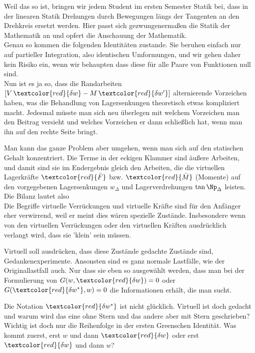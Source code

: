 Weil das so ist, bringen wir jedem Student im ersten Semester Statik bei, dass in der linearen Statik Drehungen durch Bewegungen l\"{a}ngs der Tangenten an den Drehkreis ersetzt werden. Hier passt sich gezwungenerma{\ss}en die Statik der Mathematik an und opfert die Anschauung der Mathematik.
\\

Genau so kommen die folgenden Identit\"{a}ten zustande. Sie beruhen einfach nur auf partieller Integration, also identischen Umformungen, und wir gehen daher kein Risiko ein, wenn wir behaupten dass diese f\"{u}r alle Paare von Funktionen null sind.
\\

Nun ist es ja so, dass die Randarbeiten $[V\,\textcolor{red}{\delta w} - M\,\textcolor{red}{\delta w'}]$ alternierende Vorzeichen haben, was die Behandlung von Lagersenkungen theoretisch etwas kompliziert macht. Jedesmal m\"{u}sste man sich neu \"{u}berlegen mit welchem Vorzeichen man den Beitrag versieht und welches Vorzeichen er dann schlie{\ss}lich hat, wenn man ihn auf den rechte Seite bringt.

Man kann das ganze Problem aber umgehen, wenn man sich auf den statischen Gehalt konzentriert. Die Terme in der eckigen Klammer sind \"{a}u{\ss}ere Arbeiten, und damit sind sie im Endergebnis gleich den Arbeiten, die die virtuellen Lagerkr\"{a}fte $\textcolor{red}{\bar{F}}$ bzw. $\textcolor{red}{\bar{M}}$ (Momente) auf den vorgegebenen Lagersenkungen $w_\Delta$ und Lagerverdrehungen $\tan \Np_\Delta$ leisten. Die Bilanz lautet also
\\



Die Begriffe virtuelle Verr\"{u}ckungen und virtuelle Kr\"{a}fte sind f\"{u}r den Anf\"{a}nger eher verwirrend, weil er meint dies w\"{a}ren spezielle Zust\"{a}nde. Insbesondere wenn von den virtuellen Verr\"{u}ckungen oder den virtuellen Kr\"{a}ften ausdr\"{u}cklich verlangt wird, dass sie 'klein' sein m\"{u}ssen.

Virtuell soll ausdr\"{u}cken, dass diese Zust\"{a}nde gedachte Zust\"{a}nde sind, Gedankenexperimente. Ansonsten sind es ganz normale Lastf\"{a}lle, wie der Originallastfall auch. Nur dass sie eben so ausgew\"{a}hlt werden, dass man bei der Formulierung von $G(w, \textcolor{red}{\delta w}) = 0 $ oder $G(\textcolor{red}{\delta w^*},  w) = 0 $ die Informationen erh\"{a}lt, die man sucht.

Die Notation $\textcolor{red}{\delta w^*}$ ist nicht gl\"{u}cklich. Virtuell ist doch gedacht und warum wird das eine ohne Stern und das andere aber mit Stern geschrieben? Wichtig ist doch nur die Reihenfolge in der ersten Greenschen Identit\"{a}t. Was kommt zuerst, erst $w$ und dann $\textcolor{red}{\delta w} $ oder erst $\textcolor{red}{\delta w}$ und dann $w$?
\\

